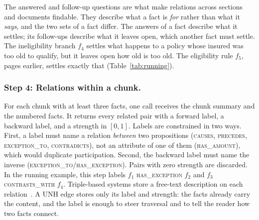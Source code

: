 \documentclass[sigconf, review, anonymous]{acmart}
\newcommand{\sys}{UNH}
\newcommand{\rel}[1]{\textsc{#1}}            %
\begin{document}
The answered and follow-up questions are what make relations across sections and documents findable. They describe what a fact is \emph{for} rather than what it \emph{says}, and the two sets of a fact differ. The answers of a fact describe what it settles; its follow-ups describe what it leaves open, which another fact must settle. The ineligibility branch $f_4$ settles what happens to a policy whose insured was too old to qualify, but it leaves open how old is too old. The eligibility rule $f_5$, pages earlier, settles exactly that (Table~\ref{tab:running}).

\subsubsection*{Step 4: Relations within a chunk.}
For each chunk with at least three facts, one call receives the chunk summary and the numbered facts. It returns every related pair with a forward label, a backward label, and a strength in $[0, 1]$. Labels are constrained in two ways. First, a label must name a relation \emph{between} two propositions (\rel{causes}, \rel{precedes}, \rel{exception\_to}, \rel{contradicts}), not an attribute of one of them (\rel{has\_amount}), which would duplicate participation. Second, the backward label must name the inverse (\rel{exception\_to}/\rel{has\_exception}). Pairs with zero strength are discarded. In the running example, this step labels $f_1$ \rel{has\_exception} $f_2$ and $f_3$ \rel{contrasts\_with} $f_4$. Triple-based systems store a free-text description on each relation~\cite{edge2024local,guo2024lightrag}. A \sys{} edge stores only its label and strength: the facts already carry the content, and the label is enough to steer traversal and to tell the reader how two facts connect.
\end{document}
